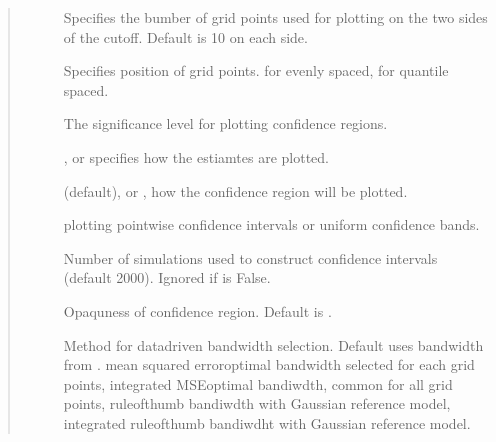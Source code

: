 \documentclass[letterpaper,10pt,english]{sphinxmanual}
\begin{document}
\begin{fulllineitems}
\begin{quote}
\begin{description}
\begin{description}
\item[{}] \leavevmode
\sphinxAtStartPar
Specifies the bumber of grid points used for plotting on the two sides of the cutoff. Default is 10 on each side.

\item[{}] \leavevmode
\sphinxAtStartPar
Specifies position of grid points.  for evenly spaced,  for quantile spaced.

\item[{}] \leavevmode
\sphinxAtStartPar
The significance level for plotting confidence regions.

\item[{}] \leavevmode
\sphinxAtStartPar
{},  or  specifies how the estiamtes are plotted.

\item[{}] \leavevmode
\sphinxAtStartPar
{} (default),   or , how the confidence region will be plotted.

\item[{}] \leavevmode
\sphinxAtStartPar
plotting pointwise confidence intervals or uniform confidence bands.

\item[{}] \leavevmode
\sphinxAtStartPar
Number of simulations used to construct confidence intervals (default 2000). Ignored if  is False.

\item[{}] \leavevmode
\sphinxAtStartPar
Opaquness of confidence region. Default is .

\item[{}] \leavevmode
\sphinxAtStartPar
Method for data\sphinxhyphen{}driven bandwidth selection. Default uses bandwidth from . \sphinxhyphen{} mean squared error\sphinxhyphen{}optimal bandwidth selected for each grid points, \sphinxhyphen{} integrated MSE\sphinxhyphen{}optimal bandiwdth, common for all grid points, \sphinxhyphen{} rule\sphinxhyphen{}of\sphinxhyphen{}thumb bandiwdth with Gaussian reference model, \sphinxhyphen{}integrated rule\sphinxhyphen{}of\sphinxhyphen{}thumb bandiwdht with Gaussian reference model.


\end{description}
\end{description}
\end{quote}
\end{fulllineitems}
\end{document}
